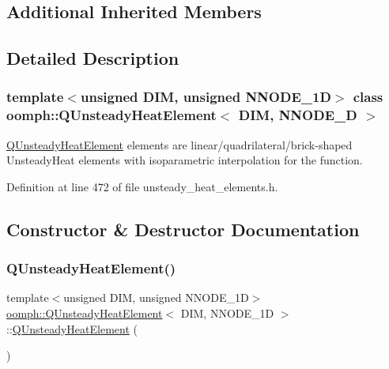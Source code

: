 \subsection*{Additional Inherited Members}


\subsection{Detailed Description}
\subsubsection*{template$<$unsigned D\+IM, unsigned N\+N\+O\+D\+E\+\_\+1D$>$\newline
class oomph\+::\+Q\+Unsteady\+Heat\+Element$<$ D\+I\+M, N\+N\+O\+D\+E\+\_\+D $>$}

\hyperlink{classoomph_1_1QUnsteadyHeatElement}{Q\+Unsteady\+Heat\+Element} elements are linear/quadrilateral/brick-\/shaped Unsteady\+Heat elements with isoparametric interpolation for the function. 

Definition at line 472 of file unsteady\+\_\+heat\+\_\+elements.\+h.



\subsection{Constructor \& Destructor Documentation}
\mbox{\label{classoomph_1_1QUnsteadyHeatElement_a369f5e16f4937d14d459933e181b6b4f}} 
\subsubsection{\texorpdfstring{Q\+Unsteady\+Heat\+Element()}{QUnsteadyHeatElement()}\hspace{0.1cm}{\footnotesize\ttfamily [1/2]}}
{\footnotesize\ttfamily template$<$unsigned D\+IM, unsigned N\+N\+O\+D\+E\+\_\+1D$>$ \\
\hyperlink{classoomph_1_1QUnsteadyHeatElement}{oomph\+::\+Q\+Unsteady\+Heat\+Element}$<$ D\+IM, N\+N\+O\+D\+E\+\_\+1D $>$\+::\hyperlink{classoomph_1_1QUnsteadyHeatElement}{Q\+Unsteady\+Heat\+Element} (\begin{DoxyParamCaption}{ }\end{DoxyParamCaption})\hspace{0.3cm}{\ttfamily [inline]}}



